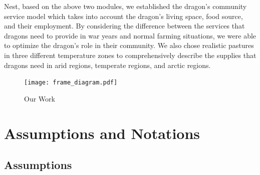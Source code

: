 \documentclass[12pt]{article}  %
\begin{document}
Nest, based on the above two modules, we established the dragon's community service model which takes into account the dragon's living space, food source, and their employment. By considering the difference between the services that dragons need to provide in war years and normal farming situations, we were able to optimize the dragon's role in their community. We also chose realistic pastures in three different temperature zones to comprehensively describe the supplies that dragons need in arid regions, temperate regions, and arctic regions.

\begin{figure}[htbp]
	\centering
	\texttt{[image: frame\_diagram.pdf]}
	\caption{Our Work}\label{fig:pic1}
\end{figure}
\vspace{-0.3cm}

\section{Assumptions and Notations}
\vspace{-0.5cm}
\subsection{Assumptions}
\vspace{-0.3cm}
\end{document}
